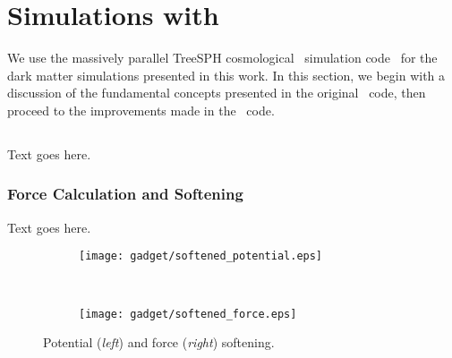 
%
%

\section{Simulations with \gadgettwo}
\label{sec:gadget}



We use the massively parallel TreeSPH cosmological \nbody\ simulation code \gadgettwo\ for the dark matter simulations presented in this work.  In this section, we begin with a discussion of the fundamental concepts presented in the original \gadget\ code, then proceed to the improvements made in the \gadgettwo\ code.




\subsection{\gadgettwo}
\label{subsec:gadget--gadget}


Text goes here.



\subsubsection{Force Calculation and Softening}
\label{subsubsec:gadget--gadget--softening}


Text goes here.

\begin{figure}[t]
	\centering
	\begin{subfigure}{}
		\texttt{[image: gadget/softened\_potential.eps]}
	\end{subfigure}
	~
	\begin{subfigure}{}
		\texttt{[image: gadget/softened\_force.eps]}
	\end{subfigure}
	\caption[Potential and force softening.]{Potential (\emph{left}) and force (\emph{right}) softening.}
	\label{fig:gadget--softening}
\end{figure}



